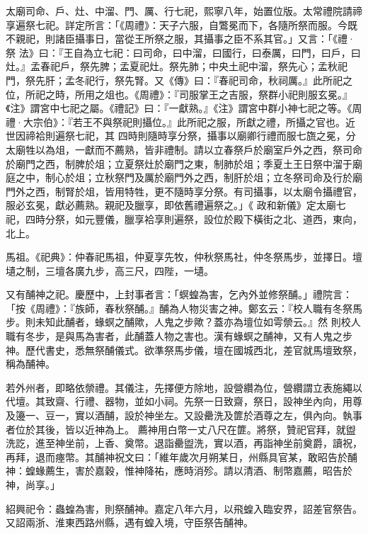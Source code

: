 \begin{pinyinscope}
 太廟司命、戶、灶、中溜、門、厲、行七祀，熙寧八年，始置位版。太常禮院請禘享遍祭七祀。詳定所言：「《周禮》：天子六服，自鷩冕而下，各隨所祭而服。今既不親祀，則諸臣攝事日，當從王所祭之服，其攝事之臣不系其官。」又言：「《禮·祭
 法》曰：『王自為立七祀：曰司命，曰中溜，曰國行，曰泰厲，曰門，曰戶，曰灶。』孟春祀戶，祭先脾；孟夏祀灶。祭先肺；中央土祀中溜，祭先心；孟秋祀門，祭先肝；孟冬祀行，祭先腎。又《傳》曰：『春祀司命，秋祠厲。』此所祀之位，所祀之時，所用之俎也。《周禮》：『司服掌王之吉服，祭群小祀則服玄冕。』《注》謂宮中七祀之屬。《禮記》曰：『一獻熟。』《注》謂宮中群小神七祀之等。《周禮·大宗伯》：『若王不與祭祀則攝位。』此所祀之服，所獻之禮，所攝之官也。近世因禘袷則遍祭七祀，其
 四時則隨時享分祭，攝事以廟卿行禮而服七旒之冕，分太廟牲以為俎，一獻而不薦熟，皆非禮制。請以立春祭戶於廟室戶外之西，祭司命於廟門之西，制脾於俎；立夏祭灶於廟門之東，制肺於俎；季夏土王日祭中溜于廟庭之中，制心於俎；立秋祭門及厲於廟門外之西，制肝於俎；立冬祭司命及行於廟門外之西，制腎於俎，皆用特牲，更不隨時享分祭。有司攝事，以太廟令攝禮官，服必玄冕，獻必薦熟。親祀及臘享，即依舊禮遍祭之。」《
 政和新儀》定太廟七祀，四時分祭，如元豐儀，臘享袷享則遍祭，設位於殿下橫街之北、道西，東向，北上。



 馬祖。《祀典》：仲春祀馬祖，仲夏享先牧，仲秋祭馬社，仲冬祭馬步，並擇日。壇壝之制，三壇各廣九步，高三尺，四陛，一壝。



 又有酺神之祀。慶歷中，上封事者言：「螟蝗為害，乞內外並修祭酺。」禮院言：「按《周禮》：『族師，春秋祭酺。』酺為人物災害之神。鄭玄云：『校人職有冬祭馬步。則未知此酺者，蝝螟之酺歟，人鬼之步歟？蓋亦為壇位如雩禜云。』然
 則校人職有冬步，是與馬為害者，此酺蓋人物之害也。漢有蝝螟之酺神，又有人鬼之步神。歷代書史，悉無祭酺儀式。欲準祭馬步儀，壇在國城西北，差官就馬壇致祭，稱為酺神。



 若外州者，即略依禜禮。其儀注，先擇便方除地，設營纘為位，營纘謂立表施繩以代壇。其致齋、行禮、器物，並如小祠。先祭一日致齋，祭日，設神坐內向，用尊及籩一、豆一，實以酒酺，設於神坐左。又設罍洗及篚於酒尊之左，俱內向。執事者位於其後，皆以近神為上。
 薦神用白幣一丈八尺在篚。將祭，贊祀官拜，就盥洗訖，進至神坐前，上香、奠幣。退詣罍盥洗，實以酒，再詣神坐前奠爵，讀祝，再拜，退而瘞幣。其酺神祝文曰：「維年歲次月朔某日，州縣具官某，敢昭告於酺神：蝗蝝薦生，害於嘉穀，惟神降祐，應時消殄。請以清酒、制幣嘉薦，昭告於神，尚享。」



 紹興祀令：蟲蝗為害，則祭酺神。嘉定八年六月，以飛蝗入臨安界，詔差官祭告。又詔兩浙、淮東西路州縣，遇有蝗入境，守臣祭告酺神。



\end{pinyinscope}